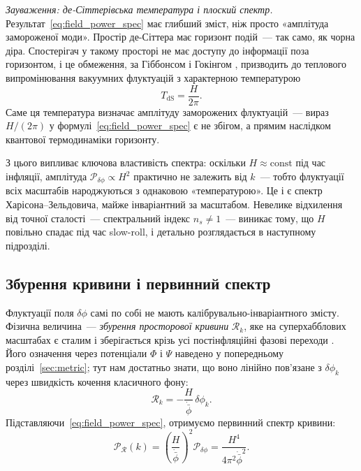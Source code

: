 \documentclass[12pt, a4paper]{article}
\begin{document}
\textit{Зауваження: де-Сіттерівська температура і плоский спектр.}
Результат~\eqref{eq:field_power_spec} має глибший зміст, ніж
просто «амплітуда замороженої моди». Простір де-Сіттера має
горизонт подій~--- так само, як чорна діра. Спостерігач у такому
просторі не має доступу до інформації поза горизонтом, і це
обмеження, за Гіббонсом і Гокінгом \cite{gibbons_hawking_1977},
призводить до теплового випромінювання вакуумних флуктуацій з
характерною температурою
\begin{equation*}
  T_\mathrm{dS} = \frac{H}{2\pi}.
\end{equation*}
Саме ця температура визначає амплітуду заморожених флуктуацій~---
вираз $H/(2\pi)$ у формулі~\eqref{eq:field_power_spec} є не
збігом, а прямим наслідком квантової термодинаміки горизонту.

З цього випливає ключова властивість спектра: оскільки $H \approx
\mathrm{const}$ під час інфляції, амплітуда $\mathcal{P}_{\delta\phi}
\propto H^2$ практично не залежить від $k$~--- тобто флуктуації
всіх масштабів народжуються з однаковою «температурою».
Це і є спектр Харісона--Зельдовича, майже інваріантний за
масштабом. Невелике відхилення від точної сталості~---
спектральний індекс $n_s \neq 1$~--- виникає тому, що $H$
повільно спадає під час slow-roll, і детально розглядається
в наступному підрозділі.


\subsection{Збурення кривини і первинний спектр}

Флуктуації поля $\delta\phi$ самі по собі не мають
калібрувально-інваріантного змісту. Фізична величина~---
\emph{збурення просторової кривини} $\mathcal{R}_k$, яке на
суперхабблових масштабах є сталим і зберігається крізь усі
постінфляційні фазові переходи \cite{bardeen_1980}. Його
означення через потенціали $\Phi$ і $\Psi$ наведено у
попередньому розділі~\ref{sec:metric}; тут нам достатньо
знати, що воно лінійно пов'язане з $\delta\phi_k$ через
швидкість кочення класичного фону:
\begin{equation}\label{eq:curvature_perturbation}
  \mathcal{R}_k = -\frac{H}{\dot{\bar{\phi}}}\,\delta\phi_k.
\end{equation}
Підставляючи~\eqref{eq:field_power_spec}, отримуємо первинний
спектр кривини:
\begin{equation}\label{eq:curvature_power_spec}
  \mathcal{P}_{\mathcal{R}}(k)
    = \left(\frac{H}{\dot{\bar{\phi}}}\right)^{\!2}
      \mathcal{P}_{\delta\phi}
    = \frac{H^4}{4\pi^2\dot{\bar{\phi}}^2}.
\end{equation}
\end{document}

